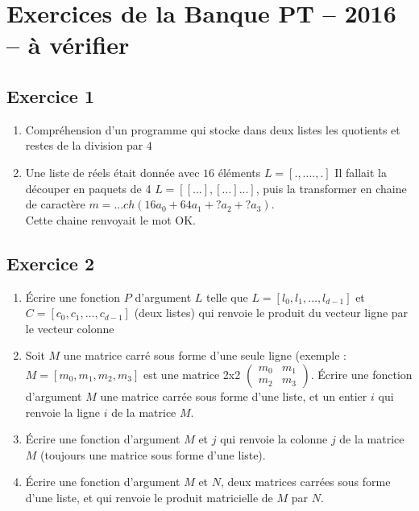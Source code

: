 \documentclass[10pt,fleqn]{article} %
\begin{document}
\newpage 
\section{Exercices de la Banque PT -- 2016 -- à vérifier }
\begin{multicols}{2}

%


\subsection*{Exercice 1}
\begin{enumerate}
 \item Compréhension d'un programme qui stocke dans deux listes les quotients et restes
 de la division par $4$
 \item Une liste de réels était donnée avec $16$ éléments $L=[.,....,.]$
 Il fallait la découper en paquets de 4 $L=[[...],[...]...]$, puis la transformer en chaine de 
 caractère $m=... ch(16a_0+64a_1+?a_2+?a_3)$.\\
 Cette chaine renvoyait le mot OK.\\
 \end{enumerate}
 



%
%
\subsection*{Exercice 2}

\begin{enumerate}
\item Écrire une fonction $P$ d'argument $L$ telle que $L = [l_0, l_1,…,l_{d-1}]$ et $C = [c_0,c_1,…,c_{d-1}]$ (deux listes) qui renvoie le produit du vecteur ligne par le vecteur colonne
\item Soit $M$ une matrice carré sous forme d'une seule ligne (exemple : $M = [m_0,m_1,m_2,m_3]$ est une matrice 2x2 $\begin{pmatrix} m_0 & m_1 \\m_2 & m_3 \end{pmatrix}$. Écrire une fonction d'argument $M$ une matrice carrée sous forme d'une liste, et un entier $i$ qui renvoie la ligne $i$ de la matrice $M$.
\item Écrire une fonction d’argument $M$ et $j$ qui renvoie la colonne $j$ de la matrice $M$ (toujours une matrice sous forme d'une liste).
\item Écrire une fonction d'argument $M$ et $N$, deux matrices carrées sous forme d'une liste, et qui renvoie le produit matricielle de $M$ par $N$. 
\end{enumerate}



\end{multicols}
\end{document}
